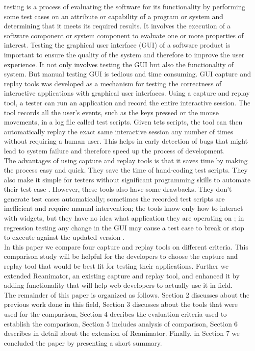 \documentclass[12pt,journal]{IEEEtran}
\begin{document}
 testing is a process of  evaluating the software for its functionality by performing some test cases on an attribute or capability of a program or system and determining that it meets its required results. It involves the execution of a software component or system component to evaluate one or more properties of interest. Testing the graphical user interface (GUI) of a software product is important to ensure the quality of the system and therefore to improve the user experience\cite{paper}. It not only involves testing the GUI but also the functionality of system. But manual testing GUI is tedious and time consuming. GUI capture and replay tools was  developed as a mechanism for testing the correctness of interactive applications with graphical user interfaces. Using a capture and replay tool, a tester can run an application and record the entire interactive session. The tool records all the user's events, such as the keys pressed or the mouse movements, in a log file called test scripts. Given tets scripts, the tool can then automatically replay the exact same interactive session any number of times without requiring a human user. This helps in early detection of bugs that might lead to system failure and therefore speed up the process of development.\\
The advantages of using capture and replay tools is that it saves time by making the process easy and quick. They save the time of hand-coding test scripts. They also make it simple for testers without significant programming skills to automate their test case \cite{Memom}. However, these tools also have some drawbacks. They don’t generate test cases automatically; sometimes the recorded test scripts are inefficient and require manual intervention; the tools know only how to interact with widgets, but they have no idea what application they are operating on \cite{Silverstein}; in regression testing any change in the GUI may cause a test case to break or stop to execute against the updated version \cite{Memom}.\\
In this paper we compare four capture and replay tools on different criteria. This comparison study will be helpful for the developers to choose the capture and replay tool that would be best fit for testing their applications. Further we extended Reanimator, an existing capture and replay tool, and enhanced it by adding functionality that will help web developers to actually use it in field.\\
 The remainder of this paper is organized as follows. Section 2 discusses about the previous work done in this field, Section 3 discusses about the tools that were used for the comparison, Section 4 decribes the evaluation criteria used to establish the comparison, Section 5 includes analysis of comparison, Section 6 describes in detail about the extension of Reanimator. Finally, in Section 7 we concluded the paper by presenting a short summary. 
 
\end{document}
